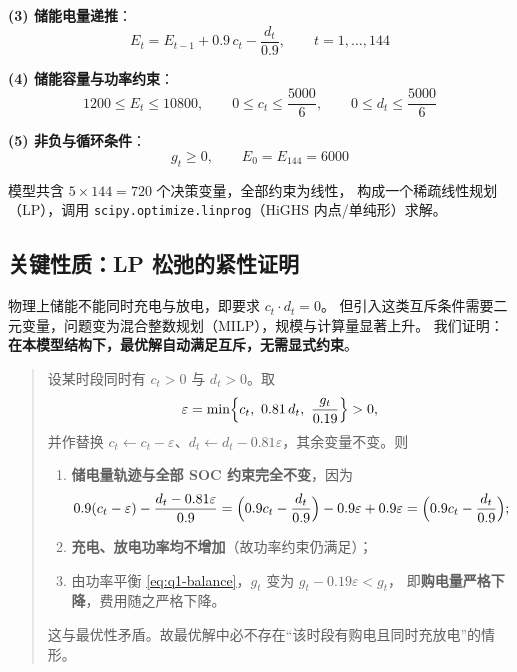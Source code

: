 \textbf{(3) 储能电量递推}：
\begin{equation}
E_t=E_{t-1}+0.9\,c_t-\frac{d_t}{0.9},\qquad t=1,\dots,144
\label{eq:q1-soc}
\end{equation}

\textbf{(4) 储能容量与功率约束}：
\begin{equation}
1200\le E_t\le 10800,\qquad 0\le c_t\le \frac{5000}{6},\qquad 0\le d_t\le \frac{5000}{6}
\end{equation}

\textbf{(5) 非负与循环条件}：
\begin{equation}
g_t\ge 0,\qquad E_0=E_{144}=6000
\label{eq:q1-cycle}
\end{equation}

模型共含 $5\times 144=720$ 个决策变量，全部约束为线性，
构成一个稀疏线性规划（LP），调用 \texttt{scipy.optimize.linprog}（HiGHS 内点/单纯形）求解。

\subsection{关键性质：LP 松弛的紧性证明}
\label{sec:q1-tight}

物理上储能不能同时充电与放电，即要求 $c_t\cdot d_t=0$。
但引入这类互斥条件需要二元变量，问题变为混合整数规划（MILP），规模与计算量显著上升。
我们证明：\textbf{在本模型结构下，最优解自动满足互斥，无需显式约束}。

\begin{quote}
设某时段同时有 $c_t>0$ 与 $d_t>0$。取
\[
\varepsilon=\min\Bigl\{c_t,\ 0.81\,d_t,\ \frac{g_t}{0.19}\Bigr\}>0,
\]
并作替换 $c_t\leftarrow c_t-\varepsilon$、$d_t\leftarrow d_t-0.81\varepsilon$，其余变量不变。则
\begin{enumerate}[label=(\roman*),itemsep=1pt,topsep=2pt]
  \item \textbf{储电量轨迹与全部 SOC 约束完全不变}，因为
    \[
    0.9(c_t-\varepsilon)-\frac{d_t-0.81\varepsilon}{0.9}
    =\Bigl(0.9c_t-\frac{d_t}{0.9}\Bigr)-0.9\varepsilon+0.9\varepsilon
    =\Bigl(0.9c_t-\frac{d_t}{0.9}\Bigr);
    \]
  \item \textbf{充电、放电功率均不增加}（故功率约束仍满足）；
  \item 由功率平衡 \eqref{eq:q1-balance}，$g_t$ 变为 $g_t-0.19\varepsilon<g_t$，
        即\textbf{购电量严格下降}，费用随之严格下降。
\end{enumerate}
这与最优性矛盾。故最优解中必不存在“该时段有购电且同时充放电”的情形。
\end{quote}

